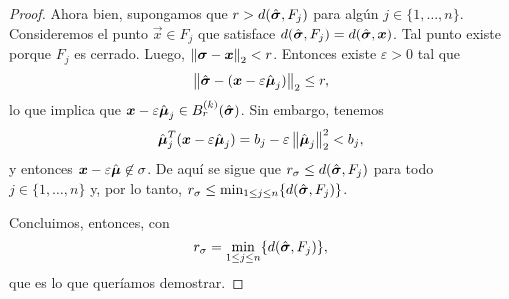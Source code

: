 \begin{proof}
	Ahora bien, supongamos que $r > d(\hat{\boldsymbol{ \sigma }}, F_j)$ para algún $j \in \lbrace 1, \ldots,
	n \rbrace$. Consideremos el punto $\vec{x} \in F_j$ que satisface $d(\hat{\boldsymbol{ \sigma }}, F_j) =
	d(\hat{\boldsymbol{ \sigma }}, \boldsymbol{x})$. Tal punto existe porque $F_j$ es cerrado. Luego,
	$\left\lVert \boldsymbol{\sigma} - \boldsymbol{x} \right\rVert_2 < r$. Entonces existe $\varepsilon > 0$ tal que
	\begin{equation*}
		\left\lVert \hat{\boldsymbol{ \sigma }} - (\boldsymbol{x} - \varepsilon\hat{\boldsymbol{ \mu }}_j) \right\rVert_2 \leq r,
	\end{equation*}
	lo que implica que $\boldsymbol{x} - \varepsilon\hat{\boldsymbol{ \mu }}_j \in
	B_r^{(k)}(\hat{\boldsymbol{ \sigma }})$. Sin embargo, tenemos
	\begin{equation*}
		\hat{\boldsymbol{ \mu }}_j^T(\boldsymbol{x} - \varepsilon\hat{\boldsymbol{ \mu }}_j) = b_j - \varepsilon\left\lVert \hat{\boldsymbol{ \mu }}_j \right\rVert_2^2 < b_j,
	\end{equation*}
	y entonces $\boldsymbol{x} - \varepsilon\hat{\boldsymbol{ \mu }} \not\in \sigma$. De aquí se sigue que $r_\sigma
	\leq d(\hat{\boldsymbol{ \sigma }}, F_j)$ para todo $j \in \lbrace 1, \ldots, n \rbrace$ y, por lo tanto,
	$r_\sigma \leq \min_{1 \leq j \leq n} \lbrace d(\hat{\boldsymbol{ \sigma }}, F_j) \rbrace$.

	Concluimos, entonces, con
	\begin{equation*}
		r_\sigma = \min_{1 \leq j \leq n} \lbrace d(\hat{\boldsymbol{ \sigma }}, F_j) \rbrace,
	\end{equation*}
	que es lo que queríamos demostrar.
\end{proof}

